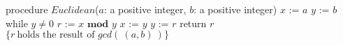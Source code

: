 
\begin{algorithm}[caption={Euclidean algorithm for calculating greatest common divisor}]
    procedure $\textit{Euclidean}$($a$: a positive integer, $b$: a positive integer)
    $x$ := $a$
    $y$ := $b$
    while $y \neq 0$
      $r$ := $x \textbf{ mod } y$
      $x$ := $y$
      $y$ := $r$
    return $r$ $\{ r~\textrm{holds the result of } gcd(~(a,b)~)\} $
\end{algorithm}